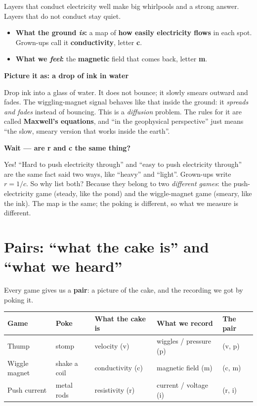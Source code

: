 \documentclass[11pt,a4paper]{article}
\newenvironment{storybox}[1]
  {\par\medskip\noindent
   \begin{lrbox}{\storyboxsave}
   \begin{minipage}{\dimexpr\linewidth-2\fboxsep-2\fboxrule\relax}
   \textbf{#1}\par\smallskip}
  {\end{minipage}\end{lrbox}%
   \fcolorbox{rule}{boxbg}{\usebox{\storyboxsave}}\par\medskip}
\begin{document}
Layers that conduct electricity well make big whirlpools and a strong answer.
Layers that do not conduct stay quiet.

\begin{itemize}[leftmargin=2em]
  \item \textbf{What the ground \emph{is}:} a map of \textbf{how easily electricity flows} in each spot.
        Grown-ups call it \textbf{conductivity}, letter \textbf{c}.
  \item \textbf{What we \emph{feel}:} the \textbf{magnetic} field that comes back, letter \textbf{m}.
\end{itemize}

\begin{storybox}{Picture it as: a drop of ink in water}
Drop ink into a glass of water. It does not bounce; it slowly smears outward
and fades. The wiggling-magnet signal behaves like that inside the ground:
it \emph{spreads and fades} instead of bouncing. This is a \emph{diffusion} problem.
The rules for it are called \textbf{Maxwell's equations}, and ``in the geophysical
perspective'' just means ``the slow, smeary version that works inside the earth''.
\end{storybox}

\begin{storybox}{Wait --- are r and c the same thing?}
Yes! ``Hard to push electricity through'' and ``easy to push electricity through''
are the same fact said two ways, like ``heavy'' and ``light''.
Grown-ups write $r = 1/c$.
So why list both? Because they belong to two \emph{different games}:
the push-electricity game (steady, like the pond) and the wiggle-magnet game
(smeary, like the ink). The map is the same; the poking is different,
so what we measure is different.
\end{storybox}

\section*{Pairs: ``what the cake is'' and ``what we heard''}

Every game gives us a \textbf{pair}: a picture of the cake, and the recording we got by poking it.

\begin{center}
\begin{tabular}{@{}lllll@{}}
\toprule
Game & Poke & What the cake is & What we record & The pair \\
\midrule
\textcolor{seismic}{Thump}        & stomp        & velocity (v)     & wiggles / pressure (p) & (v, p) \\
\textcolor{magnet}{Wiggle magnet} & shake a coil & conductivity (c) & magnetic field (m)     & (c, m) \\
\textcolor{electric}{Push current}& metal rods   & resistivity (r)  & current / voltage (i)  & (r, i) \\
\bottomrule
\end{tabular}
\end{center}
\end{document}
